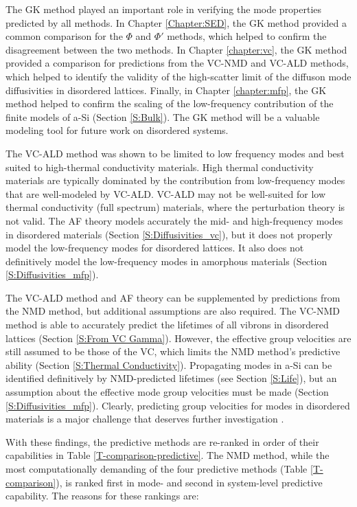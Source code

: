 The GK method played an important role in verifying the mode properties 
predicted by all methods. In Chapter \ref{Chapter:SED}, 
the GK method provided a common comparison for the $\Phi$ and $\Phi'$ 
methods, which helped to confirm 
the disagreement between the two methods. In Chapter \ref{chapter:vc}, 
the GK method provided a comparison for predictions from the VC-NMD 
and VC-ALD methods, which helped to identify the validity of the 
high-scatter limit of the diffuson mode diffusivities in disordered 
lattices. Finally, in Chapter \ref{chapter:mfp}, the GK method helped 
to confirm the scaling of the low-frequency contribution of the 
finite models of a-Si (Section \ref{S:Bulk}). The GK method will 
be a valuable modeling tool for future work on disordered systems. 

The VC-ALD method was shown to be limited to low frequency modes 
and best suited to high-thermal conductivity materials. High thermal 
conductivity materials are typically dominated by the contribution from 
low-frequency modes that are well-modeled 
by VC-ALD. VC-ALD may not be well-suited for low thermal conductivity 
(full spectrum) materials, where the perturbation theory is not 
valid. The AF theory models accurately the mid- and high-frequency 
modes in disordered materials (Section \ref{S:Diffusivities_vc}), 
but it does not properly model the low-frequency 
modes for disordered lattices. It also does not definitively model 
the low-frequency modes in amorphous materials 
(Section \ref{S:Diffusivities_mfp}). 

The VC-ALD method and AF theory can be supplemented by predictions 
from the NMD method, 
but additional assumptions are also required. 
The VC-NMD method is able to accurately predict the lifetimes 
of all vibrons in disordered lattices 
(Section \ref{S:From VC Gamma}). However, the 
effective group velocities are still assumed to be those of the VC, 
which limits the NMD method's predictive ability 
(Section \ref{S:Thermal Conductivity}). Propagating modes in a-Si 
can be identified definitively by NMD-predicted 
lifetimes (see Section \ref{S:Life}), 
but an assumption about the effective mode 
group velocities must be made (Section \ref{S:Diffusivities_mfp}). 
Clearly, predicting group velocities for modes in disordered materials  
is a major challenge that deserves further investigation 
\cite{duda_reducing_2011,donadio_atomistic_2009,
he_heat_2011,he_thermal_2011,he_morphology_2011,hori_phonon_2013}.

With these findings, the predictive methods are re-ranked in order 
of their capabilities in 
Table \ref{T-comparison-predictive}. The NMD method, while the most 
computationally demanding of the four predictive methods 
(Table \ref{T-comparison}), 
is ranked first in mode- and second in system-level predictive 
capability. The reasons for these rankings are:

